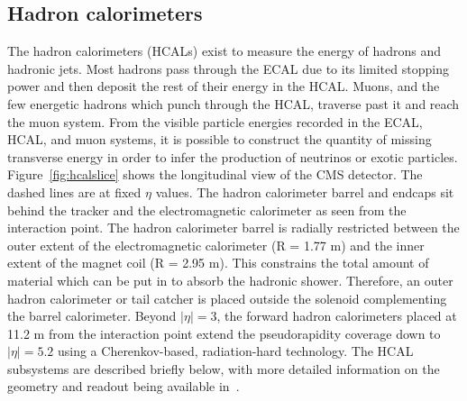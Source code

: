 \subsection{Hadron calorimeters}
The hadron calorimeters (HCALs) exist to measure the energy of hadrons and hadronic jets.
Most hadrons pass through the ECAL due to its limited stopping power and then deposit the rest of their energy in the HCAL.
Muons, and the few energetic hadrons which punch through the HCAL, traverse past it and reach the muon system.
From the visible particle energies recorded in the ECAL, HCAL, and muon systems, 
it is possible to construct the quantity of missing transverse energy in order to
infer the production of neutrinos or exotic particles.
Figure~\ref{fig:hcalslice} shows the longitudinal view of the CMS detector. The dashed lines are at fixed $\eta$ values. 
The hadron calorimeter barrel and endcaps sit behind the tracker and the electromagnetic
calorimeter as seen from the interaction point. The hadron calorimeter barrel is radially restricted
between the outer extent of the electromagnetic calorimeter (R = 1.77 m) and the inner extent of
the magnet coil (R = 2.95 m). This constrains the total amount of material which can be put in
to absorb the hadronic shower. Therefore, an outer hadron calorimeter or tail catcher is placed
outside the solenoid complementing the barrel calorimeter. Beyond $|\eta| = 3$, the forward hadron
calorimeters placed at 11.2 m from the interaction point extend the pseudorapidity coverage down
to $|\eta| = 5.2$ using a Cherenkov-based, radiation-hard technology.
The HCAL subsystems are described briefly below, with more detailed information on the geometry and 
readout being available in~\cite{CMSTDR}.

